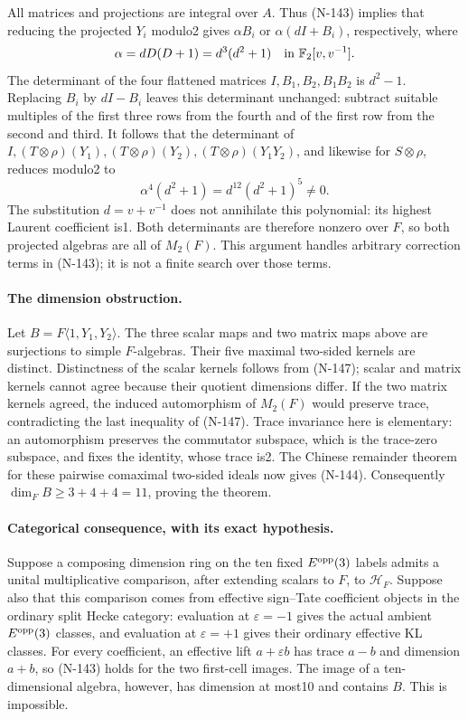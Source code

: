 All matrices and projections are integral over $A$.  Thus (N-143)
implies that reducing the projected $Y_i$ modulo2 gives
$\alpha B_i$ or $\alpha(dI+B_i)$, respectively, where
\[
        \alpha=dD(D+1)=d^3(d^2+1)
        \quad\hbox{in }\mathbb F_2[v,v^{-1}].
\]
The determinant of the four flattened matrices
$I,B_1,B_2,B_1B_2$ is $d^2-1$.
Replacing $B_i$ by $dI-B_i$ leaves this determinant unchanged:
subtract suitable multiples of the first three rows from the fourth
and of the first row from the second and third.
It follows that the determinant of
$I,(T\otimes\rho)(Y_1),(T\otimes\rho)(Y_2),
 (T\otimes\rho)(Y_1Y_2)$, and likewise for $S\otimes\rho$,
reduces modulo2 to
\[
               \alpha^4(d^2+1)=d^{12}(d^2+1)^5\ne0.
               \tag{N-150}
\]
The substitution $d=v+v^{-1}$ does not annihilate this polynomial:
its highest Laurent coefficient is1.  Both determinants are
therefore nonzero over $F$, so both projected algebras are all of
$M_2(F)$.  This argument handles arbitrary correction terms in
(N-143); it is not a finite search over those terms.

\paragraph{The dimension obstruction.}
Let $B=F\langle1,Y_1,Y_2\rangle$.  The three scalar maps and two
matrix maps above are surjections to simple $F$-algebras.
Their five maximal two-sided kernels are distinct.  Distinctness
of the scalar kernels follows from (N-147); scalar and matrix kernels
cannot agree because their quotient dimensions differ.  If the two
matrix kernels agreed, the induced automorphism of $M_2(F)$ would
preserve trace, contradicting the last inequality of (N-147).
Trace invariance here is elementary: an automorphism preserves the
commutator subspace, which is the trace-zero subspace, and fixes the
identity, whose trace is2.  The Chinese remainder theorem for these
pairwise comaximal two-sided ideals now gives (N-144).
Consequently $\dim_F B\ge3+4+4=11$, proving the theorem.

\paragraph{Categorical consequence, with its exact hypothesis.}
Suppose a composing dimension ring on the ten fixed $E^{\rm opp}(3)$
labels admits a unital multiplicative comparison, after extending
scalars to $F$, to $\mathscr H_F$.  Suppose also that this comparison
comes from effective sign--Tate coefficient objects in the ordinary
split Hecke category: evaluation at $\varepsilon=-1$ gives the actual
ambient $E^{\rm opp}(3)$ classes, and evaluation at $\varepsilon=+1$
gives their ordinary effective KL classes.  For every coefficient,
an effective lift $a+\varepsilon b$ has trace $a-b$ and dimension
$a+b$, so (N-143) holds for the two first-cell images.  The image of
a ten-dimensional algebra, however, has dimension at most10 and
contains $B$.  This is impossible.

